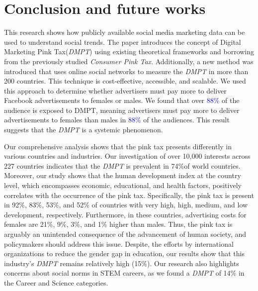 \documentclass[twocolumn]{bmcart}\usepackage{lineno}
\begin{document}
				




















%
 



\section{Conclusion and future works}
This research shows how publicly available social media marketing data can be used to understand social trends. The paper introduces the concept of Digital Marketing Pink Tax(\emph{DMPT}) using existing theoretical frameworks and borrowing from the previously studied \emph{Consumer Pink Tax}. Additionally, a new method was introduced that uses online social networks to measure the \emph{DMPT} in more than 200 countries. This technique is cost-effective, accessible, and scalable. We used this approach to determine whether advertisers must pay more to deliver Facebook advertisements to females or males. We found that over \textcolor{blue}{88\%} of the audience is exposed to DMPT, meaning advertisers must pay more to deliver advertisements to females than males in \textcolor{blue}{88\%}  of the audiences. This result suggests that the \emph{DMPT} is a systemic phenomenon.

Our comprehensive analysis shows that the pink tax presents differently in various countries and industries. Our investigation of over 10,000 interests across 227 countries indicates that the \emph{DMPT} is prevalent in \color{blue}74\%of world countries. Moreover, our study shows that the human development index at the country level, which encompasses economic, educational, and health factors, positively correlates with the occurrence of the pink tax. Specifically, the pink tax is present in 92\%, 83\%, 53\%, and 52\% of countries with very high, high, medium, and low development, respectively. Furthermore, in these countries, advertising costs for females are 21\%, 9\%, 3\%, and 1\%  higher than males. Thus, the pink tax is arguably an unintended consequence of the advancement of human society, and policymakers should address this issue. Despite, the efforts by international organizations to reduce the gender gap in education, our results show that this industry's \emph{DMPT} remains relatively high (15\%). Our research also highlights concerns about social norms in STEM careers, as we found a \emph{DMPT} of 14\% in the Career and Science categories.
\end{document}
